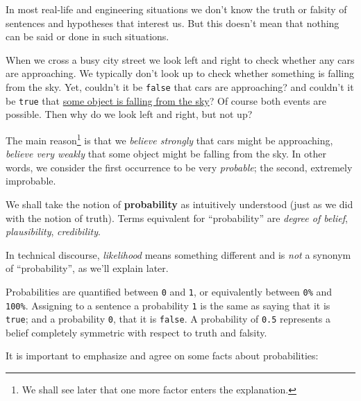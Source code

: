 \documentclass[
  a4paper,
  DIV=11,
  numbers=noendperiod,
  oneside]{scrreprt}
\begin{document}
In most real-life and engineering situations we don't know the truth or
falsity of sentences and hypotheses that interest us. But this doesn't
mean that nothing can be said or done in such situations.

When we cross a busy city street we look left and right to check whether
any cars are approaching. We typically don't look up to check whether
something is falling from the sky. Yet, couldn't it be \texttt{false}
that cars are approaching? and couldn't it be \texttt{true} that
\href{https://www.aerotime.aero/articles/32818-cessna-door-falls-off-lands-in-parking-lot}{some
object is falling from the sky}? Of course both events are possible.
Then why do we look left and right, but not up?

The main reason\footnote{We shall see later that one more factor enters
  the explanation.} is that we \emph{believe strongly} that cars might
be approaching, \emph{believe very weakly} that some object might be
falling from the sky. In other words, we consider the first occurrence
to be very \emph{probable}; the second, extremely improbable.

We shall take the notion of \textbf{probability} as intuitively
understood (just as we did with the notion of truth). Terms equivalent
for ``probability'' are \emph{degree of belief}, \emph{plausibility},
\emph{credibility}.

\begin{tcolorbox}[enhanced jigsaw, colback=white, bottomrule=.15mm, rightrule=.15mm, arc=.35mm, toprule=.15mm, colframe=quarto-callout-important-color-frame, breakable, left=2mm, opacityback=0, leftrule=.75mm]

\textbf{}\vspace{2mm}

 In technical discourse, \emph{likelihood}
means something different and is \emph{not} a synonym of
``probability'', as we'll explain later.

\end{tcolorbox}

Probabilities are quantified between \texttt{0} and \texttt{1}, or
equivalently between \texttt{0\%} and \texttt{100\%}. Assigning to a
sentence a probability \texttt{1} is the same as saying that it is
\texttt{true}; and a probability \texttt{0}, that it is \texttt{false}.
A probability of \texttt{0.5} represents a belief completely symmetric
with respect to truth and falsity.

It is important to emphasize and agree on some facts about
probabilities:
\end{document}

